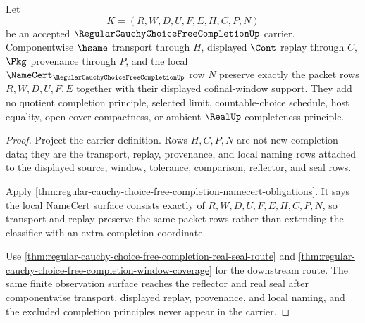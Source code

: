 \begin{theorem}
\label{thm:regular-cauchy-choice-free-completion-transport-replay}
Let
$$
K=(R,W,D,U,F,E,H,C,P,N)
$$
be an accepted $\RegularCauchyChoiceFreeCompletionUp$ carrier. Componentwise $\hsame$ transport through $H$, displayed $\Cont$ replay through $C$, $\Pkg$ provenance through $P$, and the local $\NameCert_{\RegularCauchyChoiceFreeCompletionUp}$ row $N$ preserve exactly the packet rows $R,W,D,U,F,E$ together with their displayed cofinal-window support. They add no quotient completion principle, selected limit, countable-choice schedule, host equality, open-cover compactness, or ambient $\RealUp$ completeness principle.
\end{theorem}
\begin{proof}
Project the carrier definition. Rows $H,C,P,N$ are not new completion data; they are the transport, replay, provenance, and local naming rows attached to the displayed source, window, tolerance, comparison, reflector, and seal rows.

Apply \autoref{thm:regular-cauchy-choice-free-completion-namecert-obligations}. It says the local NameCert surface consists exactly of $R,W,D,U,F,E,H,C,P,N$, so transport and replay preserve the same packet rows rather than extending the classifier with an extra completion coordinate.

Use \autoref{thm:regular-cauchy-choice-free-completion-real-seal-route} and \autoref{thm:regular-cauchy-choice-free-completion-window-coverage} for the downstream route. The same finite observation surface reaches the reflector and real seal after componentwise transport, displayed replay, provenance, and local naming, and the excluded completion principles never appear in the carrier.
\end{proof}



